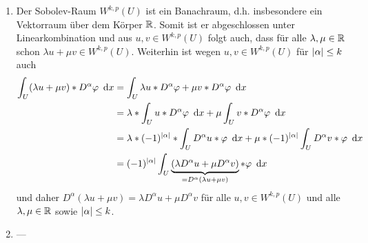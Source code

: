 \begin{exercisePage}
\begin{enumerate}[label=(zu \alph*), leftmargin=*]
		\item Der Sobolev-Raum $W^{k,p}(U)$ ist ein Banachraum, d.h. insbesondere ein Vektorraum über dem Körper $\mathbb{R}$. Somit ist er abgeschlossen unter Linearkombination und aus $u,v \in W^{k,p}(U)$ folgt auch, dass für alle $\lambda, \mu \in \mathbb{R}$ schon $\lambda u + \mu v \in W^{k,p}(U)$. Weiterhin ist wegen $u,v \in W^{k,p}(U)$ für $\left| \alpha \right| \le k$ auch
		\begin{equation*}
			\begin{aligned}
				\int_U (\lambda u + \mu v) * D^\alpha \varphi \enskip \mathrm{d}x 
				&= \int_U \lambda u * D^\alpha \varphi + \mu v * D^\alpha \varphi \enskip \mathrm{d}x \\
				&= \lambda * \int_U u * D^\alpha \varphi \enskip \mathrm{d}x + \mu \int_U v * D^\alpha \varphi \enskip \mathrm{d}x \\
				&= \lambda * (-1)^{\left| \alpha \right|} * \int_U D^\alpha u * \varphi \enskip \mathrm{d}x + \mu * (-1)^{\left| \alpha \right|} \int_U D^\alpha v * \varphi \enskip \mathrm{d}x \\
				&= (-1)^{\left| \alpha \right|} \int_U \underbrace{\left( \lambda D^\alpha u + \mu D^\alpha v \right)}_{= D^\alpha(\lambda u + \mu v)} * \varphi \enskip \mathrm{d}x
			\end{aligned}
		\end{equation*}
		und daher $D^\alpha (\lambda u + \mu v) = \lambda D^\alpha u + \mu D^\alpha v$ für alle $u,v \in W^{k,p}(U)$ und alle $\lambda, \mu \in \mathbb{R}$ sowie $\left| \alpha \right| \le k$.
		
		\item ---
	\end{enumerate}
\end{exercisePage}